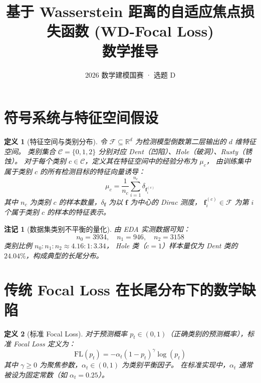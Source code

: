 \documentclass[12pt, a4paper]{ctexart}
\title{\textbf{基于 Wasserstein 距离的自适应焦点损失函数 (WD-Focal Loss) \\ 数学推导}}
\author{2026 数学建模国赛 · 选题 D}
\date{}
\newtheorem{definition}{定义}[section]
\newtheorem{remark}{注记}[section]
\begin{document}
\maketitle

\section{符号系统与特征空间假设}

\begin{definition}[特征空间与类别分布]
令 $\mathcal{F} \subseteq \mathbb{R}^d$ 为检测模型倒数第二层输出的 $d$ 维特征空间。
类别集合 $\mathcal{C} = \{0, 1, 2\}$ 分别对应 Dent（凹陷）、Hole（破洞）、Rusty（锈蚀）。
对于每个类别 $c \in \mathcal{C}$，定义其在特征空间中的经验分布为 $\mu_c$，
由训练集中属于类别 $c$ 的所有检测目标的特征向量诱导：
\begin{equation}
    \mu_c = \frac{1}{n_c} \sum_{i=1}^{n_c} \delta_{\bm{f}_i^{(c)}}
\end{equation}
其中 $n_c$ 为类别 $c$ 的样本数量，$\delta_{\bm{f}}$ 为以 $\bm{f}$ 为中心的 Dirac 测度，
$\bm{f}_i^{(c)} \in \mathcal{F}$ 为第 $i$ 个属于类别 $c$ 的样本的特征表示。
\end{definition}

\begin{remark}[数据集类别不平衡的量化]
由 EDA 实测数据可知：
\begin{equation}
    n_0 = 3934, \quad n_1 = 946, \quad n_2 = 3158
\end{equation}
类别比例 $n_0 : n_1 : n_2 \approx 4.16 : 1 : 3.34$，
Hole 类（$c=1$）样本量仅为 Dent 类的 $24.04\%$，构成典型的长尾分布。
\end{remark}

\section{传统 Focal Loss 在长尾分布下的数学缺陷}

\begin{definition}[标准 Focal Loss]
对于预测概率 $p_t \in (0,1)$（正确类别的预测概率），标准 Focal Loss 定义为：
\begin{equation}
    \mathrm{FL}(p_t) = -\alpha_t (1 - p_t)^{\gamma} \log(p_t)
    \label{eq:focal_loss}
\end{equation}
其中 $\gamma \geq 0$ 为聚焦参数，$\alpha_t \in (0,1)$ 为类别平衡因子。
在标准实现中，$\alpha_t$ 通常被设为固定常数（如 $\alpha_t = 0.25$）。
\end{definition}
\end{document}
